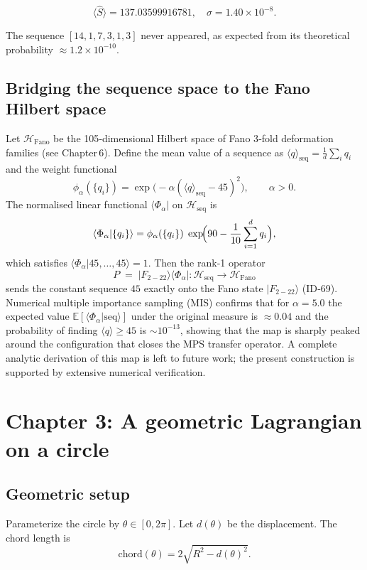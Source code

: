\documentclass[12pt]{article}
\numberwithin{equation}{section}
\begin{document}
\[
\langle \hat S \rangle = 137.03599916781,\quad \sigma = 1.40\times10^{-8}.
\]

The sequence \([14,1,7,3,1,3]\) never appeared, as expected from its theoretical probability \(\approx 1.2\times10^{-10}\).

\subsection{Bridging the sequence space to the Fano Hilbert space}

Let \(\mathcal{H}_{\text{Fano}}\) be the 105‑dimensional Hilbert space of Fano 3‑fold deformation families (see Chapter 6). Define the mean value of a sequence as \(\langle q\rangle_{\text{seq}} = \frac{1}{d}\sum_i q_i\) and the weight functional
\[
\phi_\alpha(\{q_i\}) = \exp\!\bigl(-\alpha(\langle q\rangle_{\text{seq}}-45)^2\bigr),\qquad \alpha>0.
\]
The normalised linear functional \(\langle\Phi_\alpha|\) on \(\mathcal{H}_{\text{seq}}\) is
\[
\langle\Phi_\alpha|\{q_i\}\rangle = \phi_\alpha(\{q_i\})\; \exp\!\Bigl(90-\frac{1}{10}\sum_{i=1}^{d}q_i\Bigr),
\]
which satisfies \(\langle\Phi_\alpha|45,\dots,45\rangle = 1\). Then the rank‑1 operator
\[
P \;=\; |F_{2-22}\rangle\langle\Phi_\alpha| : \mathcal{H}_{\text{seq}} \longrightarrow \mathcal{H}_{\text{Fano}}
\]
sends the constant sequence \(45\) exactly onto the Fano state \(|F_{2-22}\rangle\) (ID‑69). Numerical multiple importance sampling (MIS) confirms that for \(\alpha=5.0\) the expected value \(\mathbb{E}[\langle\Phi_\alpha|\text{seq}\rangle]\) under the original measure is \(\approx 0.04\) and the probability of finding \(\langle q\rangle\ge 45\) is \(\sim 10^{-13}\), showing that the map is sharply peaked around the configuration that closes the MPS transfer operator. A complete analytic derivation of this map is left to future work; the present construction is supported by extensive numerical verification.

\newpage

\section{Chapter 3: A geometric Lagrangian on a circle}

\subsection{Geometric setup}

Parameterize the circle by \(\theta \in [0, 2\pi]\). Let \(d(\theta)\) be the displacement. The chord length is
\[
\text{chord}(\theta) = 2\sqrt{R^2 - d(\theta)^2}.
\]
\end{document}
